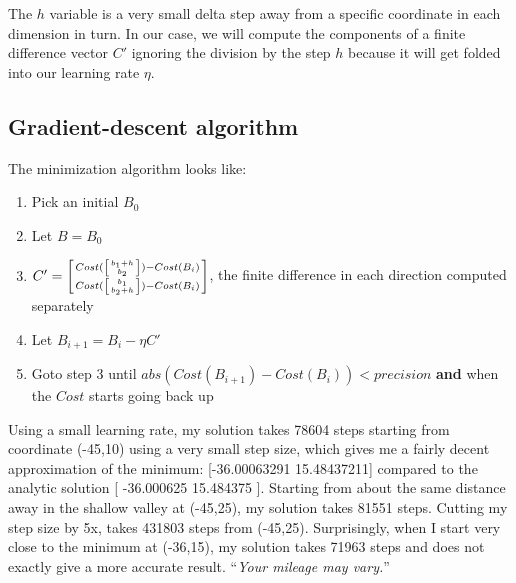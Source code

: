 \documentclass[titlepage]{tufte-book}
\begin{document}
\begin{fullwidth}
\noindent The $h$ variable is a very small delta step away from a specific coordinate in each dimension in turn. In our case, we will compute the components of a finite difference vector $C'$ ignoring the division by the step $h$ because it will get folded into our learning rate $\eta$.

\subsection{Gradient-descent algorithm}

The minimization algorithm looks like:

\begin{enumerate}
\item Pick an initial $B_0$
\item Let $B = B_0$
\item $C' = \left[ Cost(\left[ b_1+h \above 0pt{b_2} \right]) - Cost(B_i) \above 0pt Cost(\left[ b_1 \above 0pt{b_2+h} \right]) - Cost(B_i) \right]$, the finite difference in each direction computed separately
\item Let $B_{i+1} = B_i - \eta C'$
\item Goto step 3 until $abs(Cost(B_{i+1})-Cost(B_i)) < precision$ {\bf and} when the $Cost$ starts going back up
\end{enumerate}

Using a small learning rate, my solution takes 78604 steps starting from coordinate (-45,10) using a very small step size, which gives me a fairly decent approximation of the minimum: [-36.00063291  15.48437211] compared to the analytic solution [ -36.000625 15.484375 ]. Starting from about the same distance away in the shallow valley at (-45,25), my solution takes 81551 steps. Cutting my step size by 5x, takes 431803 steps from (-45,25). Surprisingly, when I start very close to the minimum at (-36,15), my solution takes 71963 steps and does not exactly give a more accurate result. ``{\em Your mileage may vary.}''


\end{fullwidth}
\end{document}
